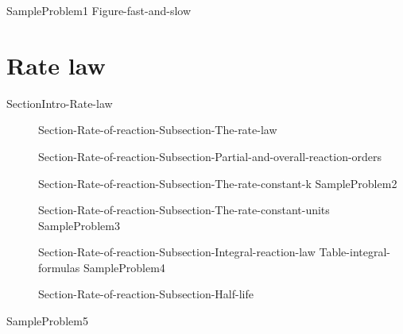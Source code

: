\documentclass[main.tex]{subfiles}
\newcommand\chapterlabel{Ch-kinetics}\setcounter{figurenewcounter}{0}\setcounter{tablenewcounter}{0}\setcounter{formulanewcounter}{0}\chapterpicture{../{\chapterlabel}/figure1}\chapterpicturelabel{PxFuel}
\begin{document}
  {SampleProblem1}
  {Figure-fast-and-slow}

\section{Rate law}{SectionIntro-Rate-law}
 \sloppy \begin{description}
\item[] {Section-Rate-of-reaction-Subsection-The-rate-law}
\item[] {Section-Rate-of-reaction-Subsection-Partial-and-overall-reaction-orders}
\item[] {Section-Rate-of-reaction-Subsection-The-rate-constant-k}
{SampleProblem2}
\item[] {Section-Rate-of-reaction-Subsection-The-rate-constant-units}
{SampleProblem3}
\item[] {Section-Rate-of-reaction-Subsection-Integral-reaction-law}
{Table-integral-formulas}
{SampleProblem4}
\item[]  {Section-Rate-of-reaction-Subsection-Half-life}
\end{description}
{SampleProblem5}
\end{document}
